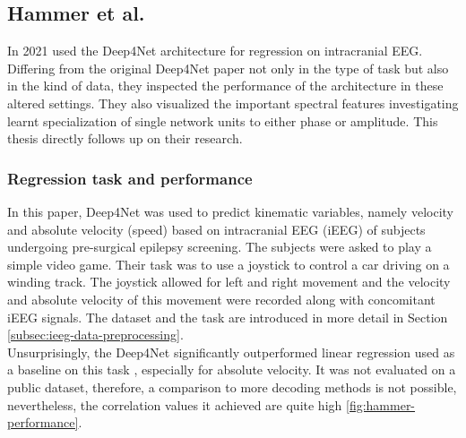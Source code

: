 \subsection{Hammer et al.}\label{subsec:hammer-et-al}
In 2021 \cite{Hammer-2021} used the Deep4Net architecture for regression on intracranial EEG.
Differing from the original Deep4Net paper not only in the type of task but also in the kind of data, they inspected the performance of the architecture in these altered settings.
They also visualized the important spectral features investigating learnt specialization of single network units to either phase or amplitude.
This thesis directly follows up on their research.

\subsubsection{Regression task and performance}
In this paper, Deep4Net was used to predict kinematic variables, namely velocity and absolute velocity (speed) based on intracranial EEG (iEEG) of subjects undergoing pre-surgical epilepsy screening. The subjects were asked to play a simple video game. 
Their task was to use a joystick to control a car driving on a winding track. 
The joystick allowed for left and right movement and the velocity and absolute velocity of this movement were recorded along with concomitant iEEG signals. 
The dataset and the task are introduced in more detail in Section \ref{subsec:ieeg-data-preprocessing}.\\

Unsurprisingly, the Deep4Net significantly outperformed linear regression used as a baseline on this task \cite{Hammer-2021}, especially for absolute velocity.
It was not evaluated on a public dataset, therefore, a comparison to more decoding methods is not possible, nevertheless, the correlation values it achieved are quite high \ref{fig:hammer-performance}.  

